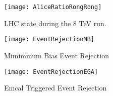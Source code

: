\begin{figure}[h]
\texttt{[image: AliceRatioRongRong]}
\centering
\caption{LHC state during the 8 TeV run. }
\label{fig:RunEff}
\end{figure}

\begin{figure}[!tbp]
  \centering
  \begin{minipage}[b]{0.4\textwidth}
    \texttt{[image: EventRejectionMB]}
    \caption{Mimimmum Bias Event Rejection}
  \end{minipage}
  \hfill
  \begin{minipage}[b]{0.49\textwidth}
    \texttt{[image: EventRejectionEGA]}
    \caption{Emcal Triggered Event Rejection}
  \end{minipage}
\end{figure}